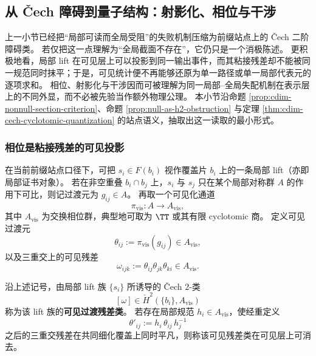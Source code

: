 \subsection{从 \v{C}ech 障碍到量子结构：射影化、相位与干涉}\label{subsec:cdim-cech-projective-phase-interference}
上一小节已经把“局部可读而全局受阻”的失败机制压缩为前缀站点上的 \v{C}ech 二阶障碍类。
若仅把这一点理解为“全局截面不存在”，它仍只是一个消极陈述。
更积极地看，局部 lift 在可见层上可以投影到同一输出事件，而其粘接残差却不能被同一规范同时抹平；于是，可见统计便不再能够还原为单一路径或单一局部代表元的逐项求和。
相位、射影化与干涉因而可被理解为同一局部--全局失配机制在表示层上的不同外显，而不必被先验当作额外物理公理。
本小节沿命题 \ref{prop:cdim-nonnull-section-criterion}、命题 \ref{prop:null-as-h2-obstruction} 与定理 \ref{thm:cdim-cech-cyclotomic-quantization} 的站点语义，抽取出这一读取的最小形式。

\subsubsection{相位是粘接残差的可见投影}
在当前前缀站点口径下，可把 \(s_i\in F(b_i)\) 视作覆盖片 \(b_i\) 上的一条局部 lift（亦即局部证书对象）。
若在非空重叠 \(b_i\cap b_j\) 上，\(s_i\) 与 \(s_j\) 只在某个局部对称群 \(A\) 的作用下可比，则记过渡元为 \(g_{ij}\in A\)。
再取一个可见化通道
\[
\pi_{\mathrm{vis}}:A\longrightarrow A_{\mathrm{vis}},
\]
其中 \(A_{\mathrm{vis}}\) 为交换相位群，典型地可取为 \(\TT\) 或其有限 cyclotomic 商。
定义可见过渡元
\[
\theta_{ij}:=\pi_{\mathrm{vis}}(g_{ij})\in A_{\mathrm{vis}},
\]
以及三重交上的可见残差
\[
\omega_{ijk}:=\theta_{ij}\theta_{jk}\theta_{ki}\in A_{\mathrm{vis}}.
\]

\begin{definition}[可见过渡残差类]\label{def:cdim-visible-transition-residual-class}
沿上述记号，由局部 lift 族 \(\{s_i\}\) 所诱导的 \v{C}ech \(2\)-类
\[
[\omega]\in \check H^2(\{b_i\},A_{\mathrm{vis}})
\]
称为该 lift 族的\textbf{可见过渡残差类}。
若存在局部规范 \(h_i\in A_{\mathrm{vis}}\)，使经重定义
\[
\theta'_{ij}:=h_i\,\theta_{ij}\,h_j^{-1}
\]
之后的三重交残差在共同细化覆盖上同时平凡，则称该可见残差类在可见层上可消去。
\end{definition}

